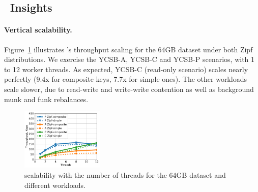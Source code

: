 \subsection{\sys\ Insights}
\label{ssec:drill} 

\paragraph{Vertical scalability.} 
Figure~\ref{fig:scalability} illustrates \sys's throughput scaling for the 64GB dataset under both Zipf  
distributions. We exercise the YCSB-A, YCSB-C and YCSB-P scenarios, with 1 to 12 worker threads.  
As expected, YCSB-C (read-only scenario) scales nearly perfectly (9.4x for composite keys, 7.7x for simple ones). 
The other workloads scale slower, due to read-write and write-write contention as well as background munk and funk rebalances. 

\begin{figure}[th]
\centering
\includegraphics[width=0.35\textwidth]{figs/scalability_line.pdf}
\caption{{\sys\/ scalability with the number of threads for 
the 64GB dataset and different workloads. }}
\label{fig:scalability}
\end{figure}

